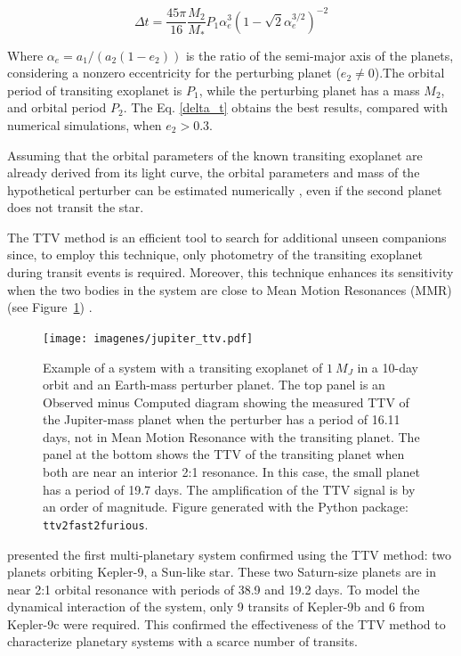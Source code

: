 \begin{equation}
\Delta t = \frac{45\pi}{16} \frac{M_2}{M_*} P_{1} \alpha^3_{e} (1-	\sqrt{2}\alpha_{e}^{3/2})^{-2}
\label{delta_t}
\end{equation}

Where $\alpha_e = a_1/(a_2(1-e_2))$ is the ratio of the semi-major axis of the planets, considering a nonzero eccentricity for the perturbing planet ($e_2 \neq 0$).The orbital period of transiting exoplanet is $P_1$, while the perturbing planet has a mass $M_2$, and orbital period $P_2$. The Eq. \ref{delta_t} obtains the best results, compared with numerical simulations, when $e_2>0.3$.


Assuming that the orbital parameters of the known transiting exoplanet are already derived from its light curve, the orbital parameters and mass of the hypothetical perturber can be estimated numerically \citep{Nesvorny2008,Nesvorny2009}, even if the second planet does not transit the star. 

The TTV method is an efficient tool to search for additional unseen companions since, to employ this technique, only photometry of the transiting exoplanet during transit events is required. Moreover, this technique enhances its sensitivity when the two bodies in the system are close to Mean Motion Resonances (MMR) \citep{Agol2005,Steffen2005,Agol2007} (see Figure~\ref{rms_ttv_amplitude}) . 

\begin{figure}[ht]
\centering
\texttt{[image: imagenes/jupiter\_ttv.pdf]}
\caption{Example of a system with a transiting exoplanet of $1~M_{J}$ in a 10-day orbit and an Earth-mass perturber planet. The top panel is an Observed minus Computed diagram showing the measured TTV of the Jupiter-mass planet when the perturber has a period of 16.11 days, not in Mean Motion Resonance with the transiting planet. The panel at the bottom shows the TTV of the transiting planet when both are near an interior 2:1 resonance. In this case, the small planet has a period of 19.7 days. The amplification of the TTV signal is by an order of magnitude. Figure generated with the Python package: \texttt{ttv2fast2furious}.}
\label{rms_ttv_amplitude}
\end{figure}

\cite{Holman2010} presented the first multi-planetary system confirmed using the TTV method: two planets orbiting Kepler-9, a Sun-like star. These two Saturn-size planets are in near 2:1 orbital resonance with periods of 38.9 and 19.2 days. To model the dynamical interaction of the system, only 9 transits of Kepler-9b and 6 from Kepler-9c were required. This confirmed the effectiveness of the TTV method to characterize planetary systems with a scarce number of transits.

